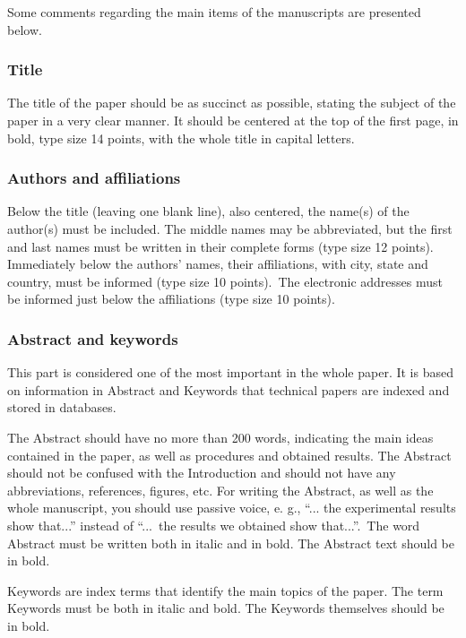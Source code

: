 \documentclass[english]{sobraep}
\begin{document}
Some comments regarding the main items of the manuscripts are presented below.

\subsubsection{Title}

The title of the paper should be as succinct as possible, stating the subject of the paper in a very clear manner. It should be centered at the top of the first page, in bold, type size 14 points, with the whole title in capital letters.

\subsubsection{Authors and affiliations}

Below the title (leaving one blank line), also centered, the name(s) of the author(s) must be included. The middle names may be abbreviated, but the first and last names must be written in their complete forms (type size 12 points). Immediately below the authors' names, their affiliations, with city, state and country, must be informed (type size 10 points).~The electronic addresses must be informed just below the affiliations (type size 10 points).

\subsubsection{Abstract and keywords}

This part is considered one of the most important in the whole paper. It is based on information in Abstract and Keywords that technical papers are indexed and stored in databases.

The Abstract should have no more than 200 words, indicating the main ideas contained in the paper, as well as procedures and obtained results. The Abstract should not be confused with the Introduction and should not have any abbreviations, references, figures, etc. For writing the Abstract, as well as the whole manuscript, you should use passive voice, e. g.,  ``... the experimental results show that...'' instead of ``...~the results we obtained show that...''.~The word Abstract must be written both in italic and in bold. The Abstract text should be in bold.

Keywords are index terms that identify the main topics of the paper. The term Keywords must be both in italic and bold. The Keywords themselves should be in bold.
\end{document}
